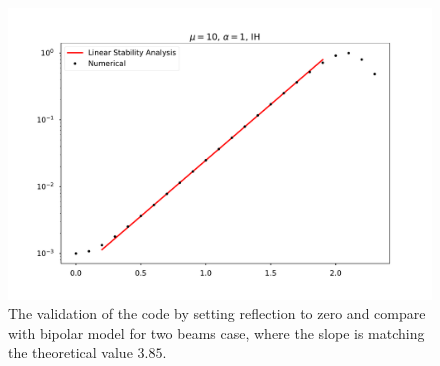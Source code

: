 \begin{figure}[htbp]
    \centering
    \includegraphics[width=\textwidth]{chapters/assets/halo/halo-mu-4-compare-bipolar.pdf}
    \caption{The validation of the code by setting reflection to zero and compare with bipolar model for two beams case, where the slope is matching the theoretical value $3.85$.}
    \label{chap:halo-sec:num-fig:compare-vac-bipolar-lsa}
\end{figure}



